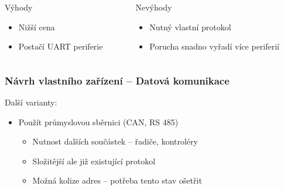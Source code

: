 \documentclass[%
  12pt,       				%
	t,                  %
	aspectratio=1610,   %
	unicode,						%
]{beamer}				    	%
\begin{document}
\begin{frame}[fragile]
		\begin{columns}[T] 								%
		\begin{column}{0.5\textwidth}		%
			\begin{block}{Výhody}
				\begin{itemize}
					\item Nižší cena \\
					\item Postačí UART periferie
				\end{itemize}
			\end{block}
		\end{column}
		\begin{column}{0.5\textwidth}		%
			\begin{alertblock}{Nevýhody}
				\begin{itemize}
					\item Nutný vlastní protokol \\
					\item Porucha snadno vyřadí více periferií
				\end{itemize}
			\end{alertblock}
		\end{column}
	\end{columns}											%
\end{frame}

\begin{frame}[fragile]
	\frametitle{Návrh vlastního zařízení -- Datová komunikace}
	Další varianty:\\[1ex]
	\begin{itemize}
		\item Použít průmyslovou sběrnici (CAN, RS 485)
		\begin{itemize}
			\item Nutnost dalších součástek -- řadiče, kontroléry
			\item Složitější ale již existující protokol
			\item Možná kolize adres -- potřeba tento stav ošetřit
		\end{itemize}
	\end{itemize}
\end{frame}
\end{document}
